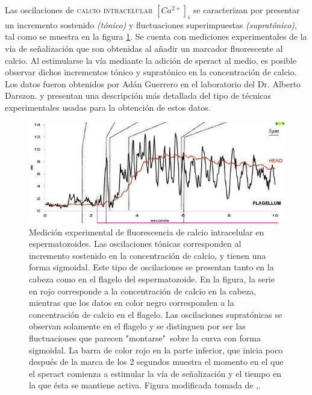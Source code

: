 Las oscilaciones de \textsc{calcio intracelular} $[Ca^{2+}]_i$ se caracterizan por presentar un incremento sostenido \emph{(tónico)} y fluctuaciones superimpuestas \emph{(supratónico)}, tal como se muestra en la figura \ref{fig:fluorescencia}. Se cuenta con mediciones experimentales de la vía de señalización que son obtenidas al añadir un marcador fluorescente al calcio. Al estimularse la vía mediante la adición de speract al medio, es posible observar dichos incrementos tónico y supratónico en la concentración de calcio. Los datos fueron obtenidos por Adán Guerrero en el laboratorio del Dr. Alberto Darszon. \citeauthor{Darszon2008} \citep{Darszon2008} y \citeauthor{Wood2007} \citep{Wood2007} presentan una descripción más detallada del tipo de técnicas experimentales usadas para la obtención de estos datos.
\\

\begin{figure}[hbt]
\includegraphics[width=0.9\linewidth]{gfx/maderaSperact}
\caption[Medición experimental de calcio intracelular]{Medición experimental de fluorescencia de calcio intracelular en espermatozoides. Las oscilaciones tónicas corresponden al incremento sostenido en la concentración de calcio, y tienen una forma sigmoidal. Este tipo de oscilaciones se presentan tanto en la cabeza como en el flagelo del espermatozoide. En la figura, la serie en rojo corresponde a la concentración de calcio en la cabeza, mientras que los datos en color negro corresponden a la concentración de calcio en el flagelo. Las oscilaciones supratónicas se observan solamente en el flagelo y se distinguen por ser las fluctuaciones que parecen "montarse"\ sobre la curva con forma sigmoidal. La barra de color rojo en la parte inferior, que inicia poco después de la marca de los 2 segundos muestra el momento en el que el speract comienza a estimular la vía de señalización y el tiempo en la que ésta se mantiene activa. Figura modificada tomada de \citeauthor{Wood:2003p4517} \citep{Wood:2003p4517},.}\label{fig:fluorescencia}
\end{figure}


